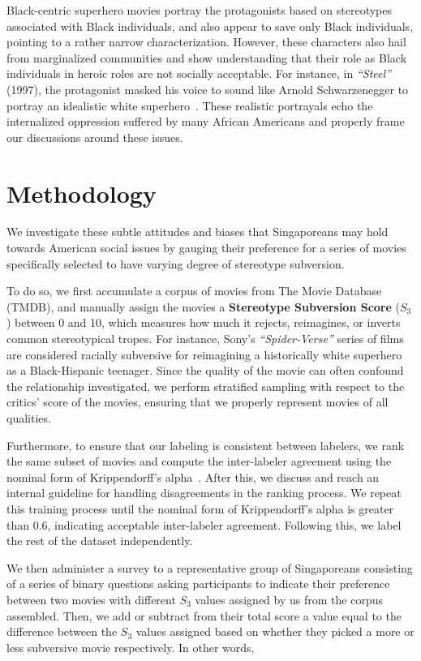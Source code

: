 \documentclass[%
 reprint,
 amsmath,amssymb,
 12pt,
rmp,
]{revtex4-2}
\begin{document}
Black-centric superhero movies portray the protagonists based on stereotypes associated with Black individuals, and also appear to save only Black individuals, pointing to a rather narrow characterization. However, these characters also hail from marginalized communities and show understanding that their role as Black individuals in heroic roles are not socially acceptable. For instance, in \emph{“Steel”} (1997), the protagonist masked his voice to sound like Arnold Schwarzenegger to portray an idealistic white superhero~\cite{tyree2014}. These realistic portrayals echo the internalized oppression suffered by many African Americans and properly frame our discussions around these issues.


\section{\label{sec:methodology}Methodology}

We investigate these subtle attitudes and biases that Singaporeans may hold towards American social issues by gauging their preference for a series of movies specifically selected to have varying degree of stereotype subversion.

To do so, we first accumulate a corpus of movies from The Movie Database (TMDB), and manually assign the movies a \textbf{Stereotype Subversion Score} ($S_3$) between 0 and 10, which measures how much it rejects, reimagines, or inverts common stereotypical tropes. For instance, Sony’s \emph{“Spider-Verse”} series of films are considered racially subversive for reimagining a historically white superhero as a Black-Hispanic teenager. Since the quality of the movie can often confound the relationship investigated, we perform stratified sampling with respect to the critics’ score of the movies, ensuring that we properly represent movies of all qualities.

Furthermore, to ensure that our labeling is consistent between labelers, we rank the same subset of movies and compute the inter-labeler agreement using the nominal form of Krippendorff's alpha~\cite{krippendorff_content_2023}. After this, we discuss and reach an internal guideline for handling disagreements in the ranking process. We repeat this training process until the nominal form of Krippendorff's alpha is greater than 0.6, indicating acceptable inter-labeler agreement. Following this, we label the rest of the dataset independently.

We then administer a survey to a representative group of Singaporeans consisting of a series of binary questions asking participants to indicate their preference between two movies with different $S_3$ values assigned by us from the corpus assembled. Then, we add or subtract from their total score a value equal to the difference between the $S_3$ values assigned based on whether they picked a more or less subversive movie respectively. In other words,
\end{document}
